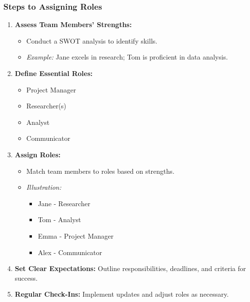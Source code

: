 \documentclass[aspectratio=169]{beamer}
\begin{document}
\begin{frame}[fragile]
    \frametitle{Steps to Assigning Roles}
    \begin{enumerate}
        \item \textbf{Assess Team Members' Strengths:}
            \begin{itemize}
                \item Conduct a SWOT analysis to identify skills.
                \item \textit{Example:} Jane excels in research; Tom is proficient in data analysis.
            \end{itemize}
        
        \item \textbf{Define Essential Roles:}
            \begin{itemize}
                \item Project Manager
                \item Researcher(s)
                \item Analyst
                \item Communicator
            \end{itemize}
        
        \item \textbf{Assign Roles:}
            \begin{itemize}
                \item Match team members to roles based on strengths.
                \item \textit{Illustration:}
                    \begin{itemize}
                        \item Jane - Researcher
                        \item Tom - Analyst
                        \item Emma - Project Manager
                        \item Alex - Communicator
                    \end{itemize}
            \end{itemize}
        
        \item \textbf{Set Clear Expectations:} Outline responsibilities, deadlines, and criteria for success.
        
        \item \textbf{Regular Check-Ins:} Implement updates and adjust roles as necessary.
    \end{enumerate}
\end{frame}
\end{document}
